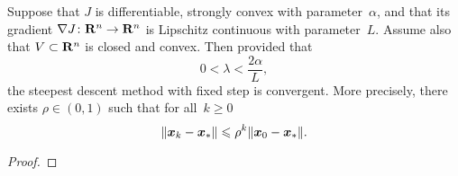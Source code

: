 \begin{theorem}
    \label{theorem:convergence_steepest_descent_optimization}
    Suppose that $J$ is differentiable, strongly convex with parameter~$\alpha$,
    and that its gradient $\nabla J \colon \mathbf R^n \to \mathbf R^n$ is Lipschitz continuous with parameter~$L$.
    Assume also that $V \subset \mathbf R^n$ is closed and convex.
    Then provided that
    \begin{equation}
        \label{eq:condition_time_step}
        0 < \lambda < \frac{2 \alpha}{L},
    \end{equation}
    the steepest descent method with fixed step is convergent.
    More precisely,
    there exists $\rho \in (0, 1)$ such that for all~$k \geq 0$
    \begin{equation}
        \label{eq:exponential_convergence}
        \lVert\mathbf{\boldsymbol{x}}_k - \mathbf{\boldsymbol{x}}_*\rVert \leqslant \rho^k \lVert\mathbf{\boldsymbol{x}}_0 - \mathbf{\boldsymbol{x}}_*\rVert.
    \end{equation}
\end{theorem}
\begin{proof}
\end{proof}
